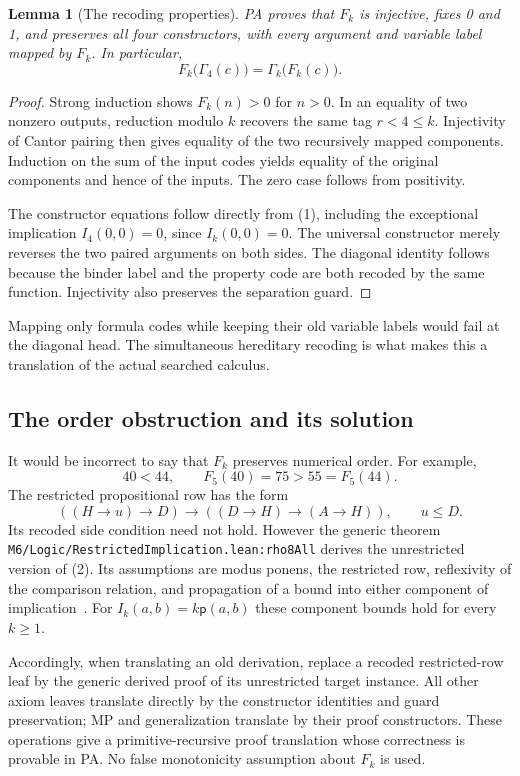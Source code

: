\documentclass[10pt,letterpaper]{article}
\newtheorem{lemma}[theorem]{Lemma}
\newcommand{\pair}{\mathsf p}
\newcommand{\file}[1]{\nolinkurl{#1}}
\begin{document}
\begin{lemma}[The recoding properties]
PA proves that $F_k$ is injective, fixes 0 and 1, and preserves all four constructors, with every argument and variable label mapped by $F_k$. In particular,
\[
 F_k\bigl(\Gamma_4(c)\bigr)=\Gamma_k\bigl(F_k(c)\bigr).
\]
\end{lemma}
\begin{proof}
Strong induction shows $F_k(n)>0$ for $n>0$. In an equality of two nonzero outputs, reduction modulo $k$ recovers the same tag $r<4\le k$. Injectivity of Cantor pairing then gives equality of the two recursively mapped components. Induction on the sum of the input codes yields equality of the original components and hence of the inputs. The zero case follows from positivity.

The constructor equations follow directly from (1), including the exceptional implication $I_4(0,0)=0$, since $I_k(0,0)=0$. The universal constructor merely reverses the two paired arguments on both sides. The diagonal identity follows because the binder label and the property code are both recoded by the same function. Injectivity also preserves the separation guard.
\end{proof}

Mapping only formula codes while keeping their old variable labels would fail at the diagonal head. The simultaneous hereditary recoding is what makes this a translation of the actual searched calculus.

\subsection{The order obstruction and its solution}

It would be incorrect to say that $F_k$ preserves numerical order. For example,
\[
 40<44,\qquad F_5(40)=75>55=F_5(44).
\]
The restricted propositional row has the form
\[
 ((H\to u)\to D)\to((D\to H)\to(A\to H)),
 \qquad u\le D.                                \tag{2}
\]
Its recoded side condition need not hold. However the generic theorem
\file{M6/Logic/RestrictedImplication.lean:rho8All} derives the unrestricted version of (2). Its assumptions are modus ponens, the restricted row, reflexivity of the comparison relation, and propagation of a bound into either component of implication~\cite{restricted}. For $I_k(a,b)=k\pair(a,b)$ these component bounds hold for every $k\ge1$.

Accordingly, when translating an old derivation, replace a recoded restricted-row leaf by the generic derived proof of its unrestricted target instance. All other axiom leaves translate directly by the constructor identities and guard preservation; MP and generalization translate by their proof constructors. These operations give a primitive-recursive proof translation whose correctness is provable in PA. No false monotonicity assumption about $F_k$ is used.
\end{document}
